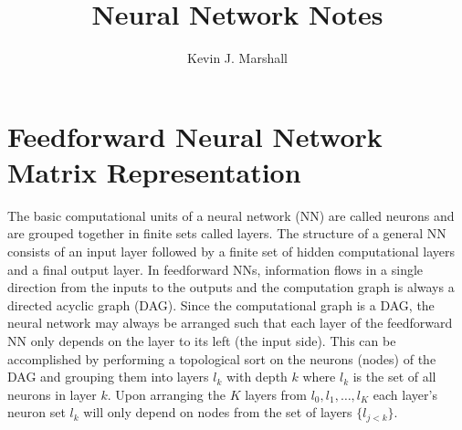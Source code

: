 \documentclass[12pt,notitlepage]{article}
\begin{document}
\title{Neural Network Notes}
\author{Kevin J. Marshall}
\maketitle

\section{Feedforward Neural Network Matrix Representation}
\label{sec:nnet-matrix-comp}
The basic computational units of a neural network (NN) are called neurons
and are grouped together in finite sets called layers.  The structure of a
general NN consists of an input layer followed by a finite
set of hidden computational layers and a final output layer.  In
feedforward NNs, information flows in a single direction from the
inputs to the outputs and the computation graph is always a directed acyclic
graph (DAG).  Since the computational graph is a DAG, the neural
network may always be arranged such that each layer of the feedforward
NN only depends on  the layer to its left (the input side).  This can
be accomplished by performing a topological sort on the neurons
(nodes) of the DAG and
grouping them into layers $l_{k}$ with depth $k$ where $l_{k}$ is the
set of all neurons in layer $k$.  Upon arranging the $K$ layers from
$l_{0},l_{1},\dots,l_{K}$ each layer's neuron set $l_{k}$ will only depend
on nodes from the set of layers $\{l_{j<k}\}$.
\end{document}
